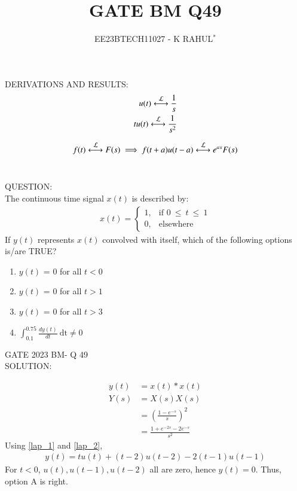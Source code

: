 \documentclass[journal,12pt,twocolumn]{IEEEtran}
\theoremstyle{remark}
\begin{document}

\vspace{3cm}
\title{GATE BM Q49}
\author{EE23BTECH11027 - K RAHUL$^{*}$%
}
\maketitle
\newpage
\bigskip
\renewcommand{\thefigure}{\theenumi}
\renewcommand{\thetable}{\theenumi}
DERIVATIONS AND RESULTS: \\
\begin{align}
u(t) \system{L} \frac{1}{s}\\
tu(t) \system{L} \frac{1}{s^2} \label{lap_1}
\end{align}
	
\begin{align}
    f(t) \system{L} F(s)  \implies f(t+a)u(t-a) \system{L} e^{as}F(s) \label{lap_2}
\end{align}\\
\bigskip

QUESTION:\\
The continuous time signal $x(t)$ is described by:
\begin{align}
x(t)=
    \begin{cases}
        1, & \text{if } 0\: {\displaystyle \leq }\:t\:{\displaystyle \leq }\:1\\
        0, & \text{elsewhere}
    \end{cases} 
\end{align}
If $y(t)$ represents $x(t)$ convolved with itself, which of the following options is/are TRUE?
\begin{enumerate}[label = \Alph*]
    \item $y(t)$ = 0 for all $t<0$\\
    \item $y(t)$ = 0 for all $t>1$\\
    \item $y(t)$ = 0 for all $t>3$\\
    \item $\int_{0.1}^{0.75} \frac{dy(t)}{dt}\: \text{dt} \neq 0$
\end{enumerate} \hfill{GATE 2023 BM- Q 49}\\
\bigskip 
\bigskip
SOLUTION:
\begin{table}[ht]

\end{table}
\bigskip
\begin{align}
    y(t) &= x(t) * x(t)\\
    Y(s) &= X(s)X(s)\\
    &=(\frac{1-e^{-s}}{s})^2\\
    &=\frac{1+e^{-2s}-2e^{-s}}{s^2}
\end{align}
Using \eqref{lap_1} and \eqref{lap_2}, 
\begin{align}
    y(t) = tu(t) + (t-2)u(t-2) -2(t-1)u(t-1)
\end{align}
For $t<0$, $u(t), u(t-1), u(t-2)$ all are zero, hence $y(t) = 0$. Thus, option A is right.\\
\end{document}
